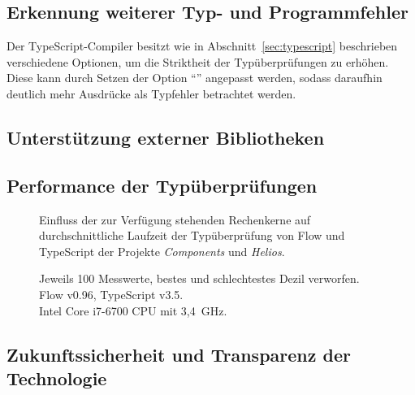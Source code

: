 \subsection{Erkennung weiterer Typ- und Programmfehler}
\label{goal:new-type-errors}

Der TypeScript-Compiler besitzt wie in Abschnitt~\ref{sec:typescript} beschrieben verschiedene Optionen, um die Striktheit der Typüberprüfungen zu erhöhen. Diese kann durch Setzen der Option \enquote{} angepasst werden, sodass daraufhin deutlich mehr Ausdrücke als Typfehler betrachtet werden.


\subsection{Unterstützung externer Bibliotheken}


\subsection{Performance der Typüberprüfungen}


\begin{figure}[tbp]
  \centering

  

  \vspace{.5\baselineskip}

  
  \vspace{.5\baselineskip}
  \caption[Einfluss der zur Verfügung stehenden Rechenkerne auf durchschnittliche Laufzeit der Typüberprüfung von Flow und TypeScript]{
    Einfluss der zur Verfügung stehenden Rechenkerne auf durchschnittliche Laufzeit der Typüberprüfung von Flow und TypeScript der Projekte \textit{Components} und \textit{Helios}.
  }

  \vspace{\baselineskip}
  \caption*{
    \small
    Jeweils 100 Messwerte, bestes und schlechtestes Dezil verworfen.\\
    Flow v0.96, TypeScript v3.5.\\
    Intel Core i7-6700 CPU mit 3,4~GHz.
  }
\end{figure}


\subsection{Zukunftssicherheit und Transparenz der Technologie}


